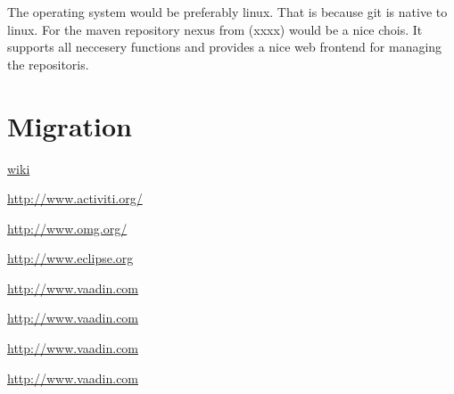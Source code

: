 \documentclass[paper=a4,twoside=false,BCOR=0mm,DIV=calc,fontsize=12pt]{scrartcl}
\begin{document}
The operating system would be preferably linux. That is because git is native to linux.
For the maven repository nexus from (xxxx) would be a nice chois. It supports all neccesery functions and provides a nice web frontend for managing the repositoris.






\section{Migration}








\begin{thebibliography}{99}

 \url{wiki}

 \url{http://www.activiti.org/}

 \url{http://www.omg.org/}

 \url{http://www.eclipse.org} %

 \url{http://www.vaadin.com}

 \url{http://www.vaadin.com}

 \url{http://www.vaadin.com}

 \url{http://www.vaadin.com}

 \url{} %


 \url{}

 \url{}

 \url{}

 \url{}

 \url{}

 \url{}

 \url{}

 \url{}

 \url{}

 \url{}


\end{thebibliography}
\end{document}
